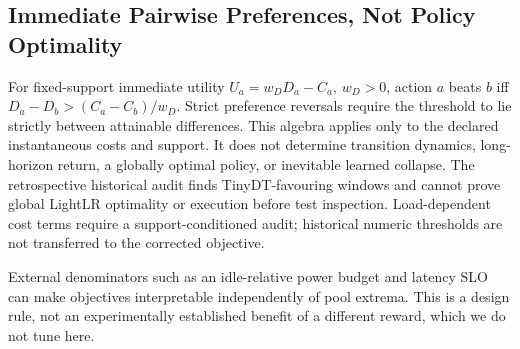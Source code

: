 \subsection{Immediate Pairwise Preferences, Not Policy Optimality}
For fixed-support immediate utility $U_a=w_DD_a-C_a$, $w_D>0$, action $a$ beats $b$ iff $D_a-D_b>(C_a-C_b)/w_D$. Strict preference reversals require the threshold to lie strictly between attainable differences. This algebra applies only to the declared instantaneous costs and support. It does not determine transition dynamics, long-horizon return, a globally optimal policy, or inevitable learned collapse. The retrospective historical audit finds TinyDT-favouring windows and cannot prove global LightLR optimality or execution before test inspection. Load-dependent cost terms require a support-conditioned audit; historical numeric thresholds are not transferred to the corrected objective.

External denominators such as an idle-relative power budget and latency SLO can make objectives interpretable independently of pool extrema. This is a design rule, not an experimentally established benefit of a different reward, which we do not tune here.
